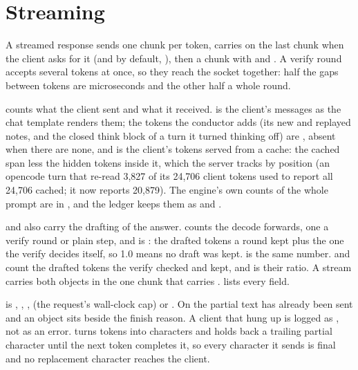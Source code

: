 \section{Streaming}

A streamed response sends one chunk per token, carries  on the last chunk when the client asks for it (and by default, ), then a chunk with  and . A verify round accepts several tokens at once, so they reach the socket together: half the gaps between tokens are microseconds and the other half a whole round.

 counts what the client sent and what it received.  is the client's messages as the chat template renders them; the tokens the conductor adds (its new and replayed notes, and the closed think block of a turn it turned thinking off) are , absent when there are none, and  is the client's tokens served from a cache: the cached span less the hidden tokens inside it, which the server tracks by position (an opencode turn that re-read 3,827 of its 24,706 client tokens used to report all 24,706 cached; it now reports 20,879). The engine's own counts of the whole prompt are in , and the ledger keeps them as  and .

 and  also carry the drafting of the answer.  counts the decode forwards, one a verify round or plain step, and  is : the drafted tokens a round kept plus the one the verify decides itself, so 1.0 means no draft was kept.  is the same number.  and  count the drafted tokens the verify checked and kept, and  is their ratio. A stream carries both objects in the one chunk that carries .  lists every field.

 is , , ,  (the request's wall-clock cap) or . On  the partial text has already been sent and an  object sits beside the finish reason. A client that hung up is logged as , not as an error.  turns tokens into characters and holds back a trailing partial character until the next token completes it, so every character it sends is final and no replacement character reaches the client.

